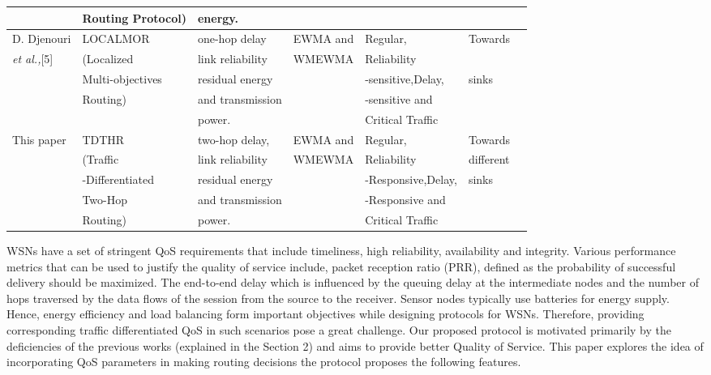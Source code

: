 \documentclass[fleqn,twoside]{article}
\begin{document}
\begin{table*}
\begin{center}
\begin{tabular}{lllllll}
    &Routing Protocol) &energy. & & & \\
\hline
    D. Djenouri & LOCALMOR &one-hop delay &EWMA and &Regular, &Towards \\
    \emph{et al.,}[5] &(Localized &link reliability &WMEWMA &Reliability \\
    &Multi-objectives &residual energy & &-sensitive,Delay, &sinks \\
    &Routing) &and transmission & &-sensitive and & \\ 
    & &power. & &Critical Traffic& \\ 
\hline
    This paper &TDTHR &two-hop delay, &EWMA and &Regular, &Towards \\  
    &(Traffic &link reliability &WMEWMA &Reliability &different \\
    &-Differentiated &residual energy & &-Responsive,Delay, &sinks \\
    &Two-Hop  &and transmission & &-Responsive and & \\
    &Routing) & power. & &Critical Traffic & \\
\hline
    \end{tabular}
\end{center}
\end{table*}
\vskip 2mm
WSNs have a set of stringent QoS requirements that include timeliness, high reliability, availability and integrity. 
Various performance metrics that can be used to justify the quality of service include, packet reception ratio (PRR), defined as the probability of successful delivery should be maximized. 
The end-to-end delay which is influenced by the queuing delay at the intermediate
nodes and the number of hops traversed by the data flows of the session from the source to the receiver.
Sensor nodes typically use batteries for energy supply. Hence, energy efficiency and load balancing form important objectives while designing protocols for WSNs. 
Therefore, providing corresponding traffic differentiated QoS in such scenarios pose a great challenge. Our proposed protocol is motivated primarily by the deficiencies of the previous works (explained in the Section 2) and aims to provide better Quality of Service.
\vskip 2mm
This paper explores the idea of incorporating QoS parameters in making routing decisions the protocol proposes the following features.
\end{document}
